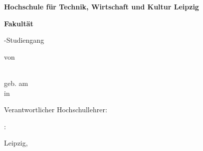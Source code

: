 \begin{titlepage}
{\centering
{\Large \textbf{Hochschule für Technik, Wirtschaft und Kultur Leipzig}\par}
{\large \textbf{Fakultät \fak} \par}
{\large \abschluss-Studiengang \studiengang\par}
\vspace{1.75cm}
{\Large \textbf{\titel}\par}
\vspace{1.5cm}
{\large \art \par}
\vspace{3cm}
{\large  von\par}
\vspace{1.25cm}
{\autor\\[3ex]
geb. am \gebdatum\\[3ex]
in \gebort\\[3ex]
\mnr\par}}
\vfill
{\noindent Verantwortlicher Hochschullehrer: \betreuerI 
\par \vspace{0.25cm}
\betreuerIItaetigkeit: \betreuerII
\par \vspace{0.75cm}
Leipzig, \zeitraum} %
\end{titlepage}
